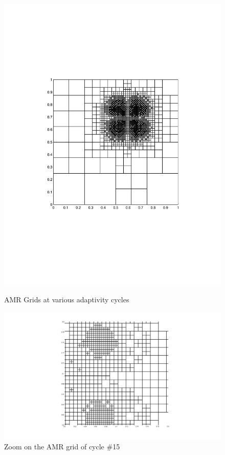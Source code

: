 \documentclass[preprint,10pt]{elsarticle}
\begin{document}
\begin{figure}[!hbtp]
{\includegraphics[scale=0.25]{../pwld_diffusion/results/amr/amr0_8_matlab_mesh_linewidth_1/amr_mms_2_threshold0_8_amr_cy30}
\label{fig:amr_cycle_30}
}
\caption{AMR Grids at various adaptivity cycles}
\label{fig:amr_grids}
\end{figure}

\begin{figure}[!hbtp]
\centering
\includegraphics[scale=0.2]{../pwld_diffusion/results/amr/amr0_8_matlab_mesh_linewidth_2/amr_mms_2_threshold0_8_amr_cy25c}
\caption{Zoom on the AMR grid of cycle \#15}
\label{fig:amr_zoom}
\end{figure}
\end{document}
